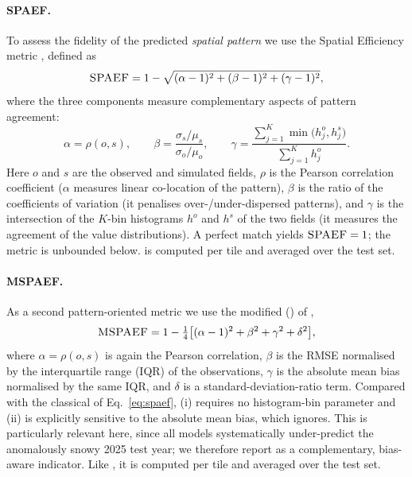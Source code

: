 \paragraph{SPAEF.}
To assess the fidelity of the predicted \emph{spatial pattern} we use the
Spatial Efficiency metric \citep{koch2018}, defined as
%
\begin{equation}
  \textsc{SPAEF} = 1 - \sqrt{(\alpha-1)^2 + (\beta-1)^2 + (\gamma-1)^2},
  \label{eq:spaef}
\end{equation}
%
where the three components measure complementary aspects of pattern agreement:
%
\begin{equation}
  \alpha = \rho(o,s), \qquad
  \beta  = \frac{\sigma_s/\mu_s}{\sigma_o/\mu_o}, \qquad
  \gamma = \frac{\sum_{j=1}^{K}\min\!\big(h^{o}_{j}, h^{s}_{j}\big)}
                {\sum_{j=1}^{K} h^{o}_{j}} .
  \label{eq:spaef_components}
\end{equation}
%
Here $o$ and $s$ are the observed and simulated fields, $\rho$ is the Pearson
correlation coefficient ($\alpha$ measures linear co-location of the pattern),
$\beta$ is the ratio of the coefficients of variation (it penalises
over-/under-dispersed patterns), and $\gamma$ is the intersection of the
$K$-bin histograms $h^{o}$ and $h^{s}$ of the two fields (it measures the
agreement of the value distributions). A perfect match yields
$\textsc{SPAEF}=1$; the metric is unbounded below. \SPAEF{} is computed per tile and
averaged over the test set.

\paragraph{MSPAEF.}
As a second pattern-oriented metric we use the modified \SPAEF{} (\MSPAEF{}) of
\citet{karpasitis2026},
%
\begin{equation}
  \textsc{MSPAEF} = 1 - \tfrac{1}{4}\big[(\alpha-1)^2 + \beta^2 + \gamma^2 + \delta^2\big],
  \label{eq:mspaef}
\end{equation}
%
where $\alpha=\rho(o,s)$ is again the Pearson correlation, $\beta$ is the RMSE
normalised by the interquartile range (IQR) of the observations, $\gamma$ is
the absolute mean bias normalised by the same IQR, and $\delta$ is a
standard-deviation-ratio term. Compared with the classical \SPAEF{} of
Eq.~\eqref{eq:spaef}, \MSPAEF{} (i) requires no histogram-bin parameter and
(ii) is explicitly sensitive to the absolute mean bias, which \SPAEF{} ignores.
This is particularly relevant here, since all models systematically
under-predict the anomalously snowy 2025 test year; we therefore report
\MSPAEF{} as a complementary, bias-aware indicator. Like \SPAEF{}, it is
computed per tile and averaged over the test set.

